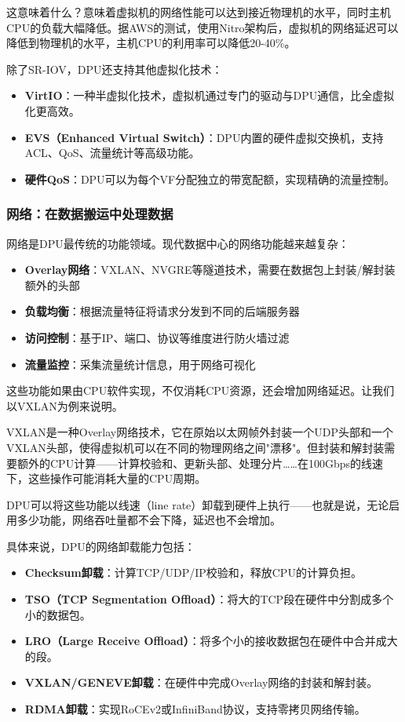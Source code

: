 这意味着什么？意味着虚拟机的网络性能可以达到接近物理机的水平，同时主机CPU的负载大幅降低。据AWS的测试，使用Nitro架构后，虚拟机的网络延迟可以降低到物理机的水平，主机CPU的利用率可以降低20-40\%。

除了SR-IOV，DPU还支持其他虚拟化技术：

\begin{itemize}
    \item \textbf{VirtIO}：一种半虚拟化技术，虚拟机通过专门的驱动与DPU通信，比全虚拟化更高效。
    \item \textbf{EVS（Enhanced Virtual Switch）}：DPU内置的硬件虚拟交换机，支持ACL、QoS、流量统计等高级功能。
    \item \textbf{硬件QoS}：DPU可以为每个VF分配独立的带宽配额，实现精确的流量控制。
\end{itemize}

\subsubsection{网络：在数据搬运中处理数据}

网络是DPU最传统的功能领域。现代数据中心的网络功能越来越复杂：

\begin{itemize}
    \item \textbf{Overlay网络}：VXLAN、NVGRE等隧道技术，需要在数据包上封装/解封装额外的头部
    \item \textbf{负载均衡}：根据流量特征将请求分发到不同的后端服务器
    \item \textbf{访问控制}：基于IP、端口、协议等维度进行防火墙过滤
    \item \textbf{流量监控}：采集流量统计信息，用于网络可视化
\end{itemize}

这些功能如果由CPU软件实现，不仅消耗CPU资源，还会增加网络延迟。让我们以VXLAN为例来说明。

VXLAN是一种Overlay网络技术，它在原始以太网帧外封装一个UDP头部和一个VXLAN头部，使得虚拟机可以在不同的物理网络之间"漂移"。但封装和解封装需要额外的CPU计算——计算校验和、更新头部、处理分片……在100Gbps的线速下，这些操作可能消耗大量的CPU周期。

DPU可以将这些功能以线速（line rate）卸载到硬件上执行——也就是说，无论启用多少功能，网络吞吐量都不会下降，延迟也不会增加。

具体来说，DPU的网络卸载能力包括：

\begin{itemize}
    \item \textbf{Checksum卸载}：计算TCP/UDP/IP校验和，释放CPU的计算负担。
    \item \textbf{TSO（TCP Segmentation Offload）}：将大的TCP段在硬件中分割成多个小的数据包。
    \item \textbf{LRO（Large Receive Offload）}：将多个小的接收数据包在硬件中合并成大的段。
    \item \textbf{VXLAN/GENEVE卸载}：在硬件中完成Overlay网络的封装和解封装。
    \item \textbf{RDMA卸载}：实现RoCEv2或InfiniBand协议，支持零拷贝网络传输。
\end{itemize}


